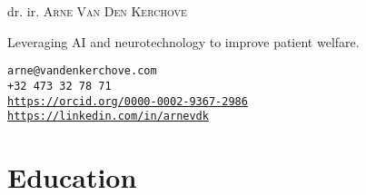 \documentclass{resume}
\begin{document}
{\Large dr. ir. \textsc{Arne Van Den Kerchove}}
\smallskip

Leveraging AI and neurotechnology to improve patient welfare.
\smallskip

\texttt{arne@vandenkerchove.com} \\
\texttt{+32 473 32 78 71} \\
\texttt{\url{https://orcid.org/0000-0002-9367-2986}} \\
\texttt{\url{https://linkedin.com/in/arnevdk}}

\section{Education}
\end{document}
